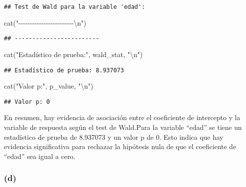 \documentclass[
]{article}
\newenvironment{Shaded}{\begin{snugshade}}{\end{snugshade}}
\newcommand{\FunctionTok}[1]{\textcolor[rgb]{0.00,0.00,0.00}{#1}}
\newcommand{\NormalTok}[1]{#1}
\newcommand{\SpecialCharTok}[1]{\textcolor[rgb]{0.00,0.00,0.00}{#1}}
\newcommand{\StringTok}[1]{\textcolor[rgb]{0.31,0.60,0.02}{#1}}
\begin{document}
\begin{verbatim}
## Test de Wald para la variable 'edad':
\end{verbatim}

\begin{Shaded}
\begin{Highlighting}[]
\FunctionTok{cat}\NormalTok{(}\StringTok{"{-}{-}{-}{-}{-}{-}{-}{-}{-}{-}{-}{-}{-}{-}{-}{-}{-}{-}{-}{-}{-}{-}{-}{-}}\SpecialCharTok{\textbackslash{}n}\StringTok{"}\NormalTok{)}
\end{Highlighting}
\end{Shaded}

\begin{verbatim}
## ------------------------
\end{verbatim}

\begin{Shaded}
\begin{Highlighting}[]
\FunctionTok{cat}\NormalTok{(}\StringTok{"Estadístico de prueba:"}\NormalTok{, wald\_stat, }\StringTok{"}\SpecialCharTok{\textbackslash{}n}\StringTok{"}\NormalTok{)}
\end{Highlighting}
\end{Shaded}

\begin{verbatim}
## Estadístico de prueba: 8.937073
\end{verbatim}

\begin{Shaded}
\begin{Highlighting}[]
\FunctionTok{cat}\NormalTok{(}\StringTok{"Valor p:"}\NormalTok{, p\_value, }\StringTok{"}\SpecialCharTok{\textbackslash{}n}\StringTok{"}\NormalTok{)}
\end{Highlighting}
\end{Shaded}

\begin{verbatim}
## Valor p: 0
\end{verbatim}

En resumen, hay evidencia de asociación entre el coeficiente de
intercepto y la variable de respuesta según el test de Wald.Para la
variable ``edad'' se tiene un estadístico de prueba de 8.937073 y un
valor p de 0. Esto indica que hay evidencia significativa para rechazar
la hipótesis nula de que el coeficiente de ``edad'' sea igual a cero.

\hypertarget{d-1}{%
\subsubsection{(d)}\label{d-1}}
\end{document}

